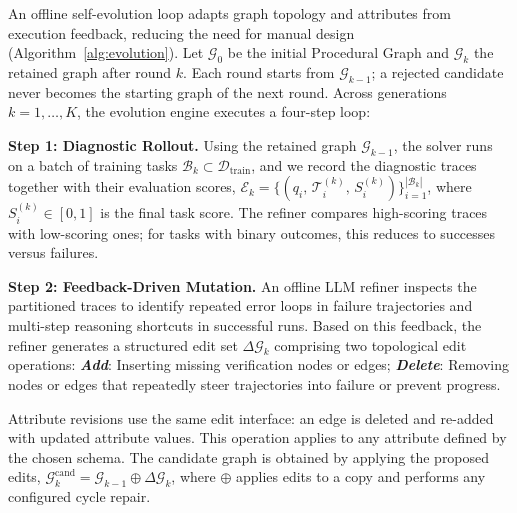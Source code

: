 An offline self-evolution loop adapts graph topology and attributes from execution feedback, reducing the need for manual design (Algorithm~\ref{alg:evolution}). Let $\mathcal{G}_0$ be the initial Procedural Graph and $\mathcal{G}_k$ the retained graph after round $k$. Each round starts from $\mathcal{G}_{k-1}$; a rejected candidate never becomes the starting graph of the next round. Across generations $k = 1, \dots, K$, the evolution engine executes a four-step loop:

\noindent\textbf{Step 1: Diagnostic Rollout.}
Using the retained graph $\mathcal{G}_{k-1}$, the solver runs on a batch of training tasks $\mathcal{B}_k \subset \mathcal{D}_{\text{train}}$, and we record the diagnostic traces together with their evaluation scores, $\mathcal{E}_k = \big\{ ( q_i, \, \mathcal{T}_i^{(k)}, \, S_i^{(k)} ) \big\}_{i=1}^{|\mathcal{B}_k|}$, where $S_i^{(k)} \in [0, 1]$ is the final task score. The refiner compares high-scoring traces with low-scoring ones; for tasks with binary outcomes, this reduces to successes versus failures.

\noindent\textbf{Step 2: Feedback-Driven Mutation.}
An offline LLM refiner inspects the partitioned traces to identify repeated error loops in failure trajectories and multi-step reasoning shortcuts in successful runs. Based on this feedback, the refiner generates a structured edit set $\Delta\mathcal{G}_k$ comprising two topological edit operations: \textbf{\emph{Add}}: Inserting missing verification nodes or edges; \textbf{\emph{Delete}}: Removing nodes or edges that repeatedly steer trajectories into failure or prevent progress.

Attribute revisions use the same edit interface: an edge is deleted and re-added with updated attribute values. This operation applies to any attribute defined by the chosen schema. The candidate graph is obtained by applying the proposed edits, $\mathcal{G}_k^{\text{cand}} = \mathcal{G}_{k-1} \oplus \Delta\mathcal{G}_k$, where $\oplus$ applies edits to a copy and performs any configured cycle repair.

